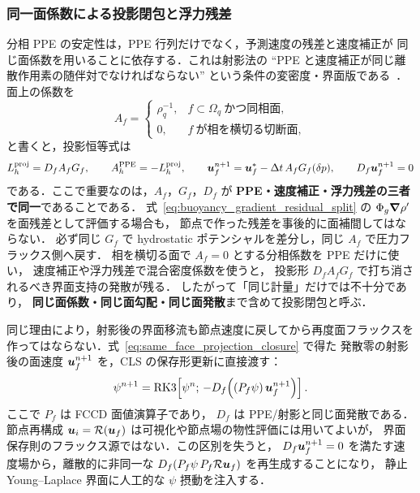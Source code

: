 \subsubsection{同一面係数による投影閉包と浮力残差}
\label{sec:per_phase_projection_closure}

分相 PPE の安定性は，PPE 行列だけでなく，予測速度の残差と速度補正が
同じ面係数を用いることに依存する．これは射影法の
``PPE と速度補正が同じ離散作用素の随伴対でなければならない''
という条件の変密度・界面版である~\cite{Chorin1968,Guermond2006}．
面上の係数を
\[
  A_f =
  \begin{cases}
    \rho_q^{-1}, & f\subset\Omega_q\ \text{かつ同相面},\\
    0, & f\ \text{が相を横切る切断面},
  \end{cases}
\]
と書くと，投影恒等式は
\begin{equation}
  L_h^\mathrm{proj} = D_f A_f G_f,\qquad
  A_h^\mathrm{PPE}=-L_h^\mathrm{proj},\qquad
  \bm{u}_f^{n+1} = \bm{u}_f^* - \Delta t\,A_fG_f(\delta p),\qquad
  D_f\bm{u}_f^{n+1}=0
  \label{eq:same_face_projection_closure}
\end{equation}
である．ここで重要なのは，$A_f$，$G_f$，$D_f$ が
\textbf{PPE・速度補正・浮力残差の三者で同一}であることである．
式~\eqref{eq:buoyancy_gradient_residual_split} の
$\Phi_g\bm{\nabla}\rho'$ を面残差として評価する場合も，
節点で作った残差を事後的に面補間してはならない．
必ず同じ $G_f$ で hydrostatic ポテンシャルを差分し，同じ $A_f$ で圧力フラックス側へ戻す．
相を横切る面で $A_f=0$ とする分相係数を PPE だけに使い，
速度補正や浮力残差で混合密度係数を使うと，
投影形 $D_fA_fG_f$ で打ち消されるべき界面支持の発散が残る．
したがって「同じ計量」だけでは不十分であり，
\textbf{同じ面係数・同じ面勾配・同じ面発散}まで含めて投影閉包と呼ぶ．

同じ理由により，射影後の界面移流も節点速度に戻してから再度面フラックスを
作ってはならない．式~\eqref{eq:same_face_projection_closure} で得た
発散零の射影後の面速度 $\bm{u}_f^{n+1}$ を，CLS の保存形更新に直接渡す：
\begin{equation}
  \psi^{n+1}
  = \mathrm{RK3}\!\left[
      \psi^n;\,
      -D_f\!\left((P_f\psi)\,\bm{u}_f^{n+1}\right)
    \right].
  \label{eq:projection_native_psi_transport}
\end{equation}
ここで $P_f$ は FCCD 面値演算子であり，
$D_f$ は PPE/射影と同じ面発散である．
節点再構成 $\bm{u}_i=\mathcal{R}(\bm{u}_f)$ は可視化や節点場の物性評価には用いてよいが，
界面保存則のフラックス源ではない．この区別を失うと，
$D_f\bm{u}_f^{n+1}=0$ を満たす速度場から，離散的に非同一な
$D_f(P_f\psi\,P_f\mathcal{R}\bm{u}_f)$ を再生成することになり，
静止 Young--Laplace 界面に人工的な $\psi$ 摂動を注入する．


